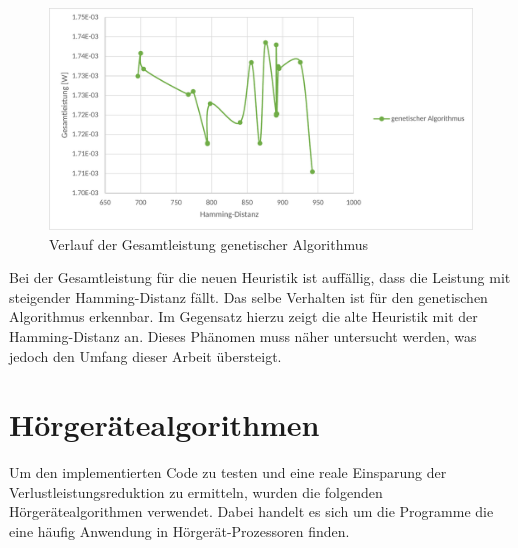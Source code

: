 \begin{figure}[H]
	\centering
	\includegraphics[width=\textwidth]{fig/totalpower_genetic.pdf}
	\caption{Verlauf der Gesamtleistung genetischer Algorithmus}
	\label{fig:totalpower_genetic}
\end{figure}

Bei der Gesamtleistung für die neuen Heuristik ist auffällig, dass die Leistung mit steigender Hamming-Distanz fällt. Das selbe Verhalten ist für den genetischen Algorithmus erkennbar. Im Gegensatz hierzu zeigt die alte Heuristik mit der Hamming-Distanz an. Dieses Phänomen muss näher untersucht werden, was jedoch den Umfang dieser Arbeit übersteigt.

\section{Hörgerätealgorithmen}
\label{sec:testprogamme}
Um den implementierten Code zu testen und eine reale Einsparung der Verlustleistungsreduktion zu ermitteln, wurden die folgenden Hörgerätealgorithmen verwendet. Dabei handelt es sich um die Programme die eine häufig Anwendung in Hörgerät-Prozessoren finden.

